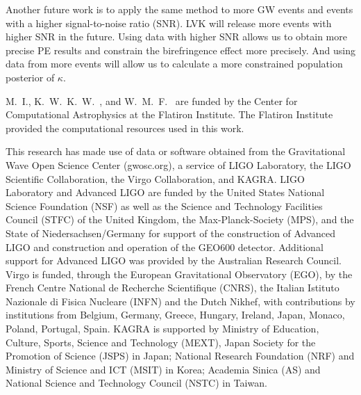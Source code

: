 \documentclass[aps,prd,twocolumn,superscriptaddress,preprintnumbers,floatfix,nofootinbib]{revtex4-2}
\begin{document}
Another future work is to apply the same method to more GW events and events with a higher signal-to-noise ratio (SNR).
LVK will release more events with higher SNR in the future.
Using data with higher SNR allows us to obtain more precise PE results and constrain the birefringence effect more precisely.
And using data from more events will allow us to calculate a more constrained population posterior of $\kappa$.

\begin{acknowledgments}
M.~I., K.~W.~K.~W.~, and W.~M.~F.~ are funded by the Center for Computational Astrophysics at the Flatiron Institute.
The Flatiron Institute provided the computational resources used in this work.

This research has made use of data or software obtained from the Gravitational Wave Open Science Center (gwosc.org), a service of LIGO Laboratory, the LIGO Scientific Collaboration, the Virgo Collaboration, and KAGRA.
LIGO Laboratory and Advanced LIGO are funded by the United States National Science Foundation (NSF) as well as the Science and Technology Facilities Council (STFC) of the United Kingdom, the Max-Planck-Society (MPS), and the State of Niedersachsen/Germany for support of the construction of Advanced LIGO and construction and operation of the GEO600 detector.
Additional support for Advanced LIGO was provided by the Australian Research Council.
Virgo is funded, through the European Gravitational Observatory (EGO), by the French Centre National de Recherche Scientifique (CNRS), the Italian Istituto Nazionale di Fisica Nucleare (INFN) and the Dutch Nikhef, with contributions by institutions from Belgium, Germany, Greece, Hungary, Ireland, Japan, Monaco, Poland, Portugal, Spain.
KAGRA is supported by Ministry of Education, Culture, Sports, Science and Technology (MEXT), Japan Society for the Promotion of Science (JSPS) in Japan; National Research Foundation (NRF) and Ministry of Science and ICT (MSIT) in Korea; Academia Sinica (AS) and National Science and Technology Council (NSTC) in Taiwan.
\end{acknowledgments}

\appendix
\section{}



\end{document}
